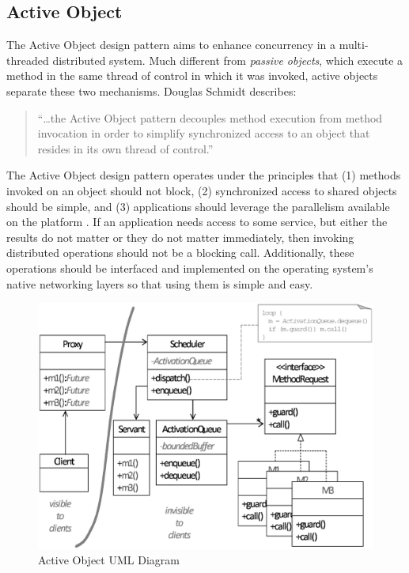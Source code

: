 \subsection{Active Object}

The Active Object design pattern aims to enhance concurrency in a multi-threaded
distributed system. Much different from \textit{passive objects}, which execute
a method in the same thread of control in which it was invoked, active objects
separate these two mechanisms. Douglas Schmidt describes:

\begin{quote}
``\ldots the Active Object pattern decouples method execution from method
invocation in order to simplify synchronized access to an object that resides in
its own thread of control.'' \cite{Schmidt96}
\end{quote}

The Active Object design pattern operates under the principles that (1) methods
invoked on an object should not block, (2) synchronized access to shared objects
should be simple, and (3) applications should leverage the parallelism available
on the platform \cite{Schmidt96}. If an application needs access to some
service, but either the results do not matter or they do not matter immediately,
then invoking distributed operations should not be a blocking call.
Additionally, these operations should be interfaced and implemented on the
operating system's native networking layers so that using them is simple and
easy.

\begin{figure}[t]
  \begin{center}
  \includegraphics[width=\textwidth]{images/activeObjectUML}
  \caption{Active Object UML Diagram}
  \label{fig:activeObjectUML}
  \end{center}
\end{figure}


